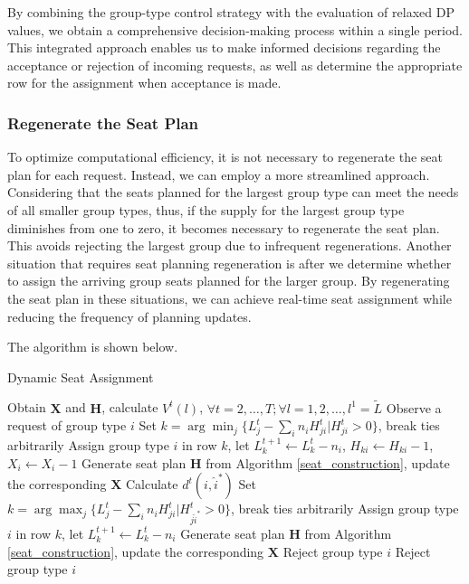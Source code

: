 
By combining the group-type control strategy with the evaluation of relaxed DP values, we obtain a comprehensive decision-making process within a single period. This integrated approach enables us to make informed decisions regarding the acceptance or rejection of incoming requests, as well as determine the appropriate row for the assignment when acceptance is made. 

\subsubsection{Regenerate the Seat Plan}
To optimize computational efficiency, it is not necessary to regenerate the seat plan for each request. Instead, we can employ a more streamlined approach. Considering that the seats planned for the largest group type can meet the needs of all smaller group types, thus, if the supply for the largest group type diminishes from one to zero, it becomes necessary to regenerate the seat plan. This avoids rejecting the largest group due to infrequent regenerations. Another situation that requires seat planning regeneration is after we determine whether to assign the arriving group seats planned for the larger group. By regenerating the seat plan in these situations, we can achieve real-time seat assignment while reducing the frequency of planning updates.

The algorithm is shown below.

\begin{algorithm}[H]
  \caption{Dynamic Seat Assignment}
  Obtain $\bm{X}$ and $\bm{H}$, calculate $V^{t}(l)$, $\forall t =2, \ldots, T; \forall l = 1,2, \ldots, l^{1}=\tilde{L}$\;
  {Observe a request of group type ${i}$\;
    {
    {Set $k = \arg \min_{j} \{L_j^{t} - \sum_{i}n_i H^{t}_{ji}|H^{t}_{ji} >0\}$, break ties arbitrarily\; 
     Assign group type $i$ in row $k$, let $L_{k}^{t+1} \gets L_{k}^{t}- n_{i}$, $H_{ki} \gets H_{ki}-1$, $X_{i}\gets X_{i}-1$\;
    {Generate seat plan $\bm{H}$ from Algorithm \ref{seat_construction}, update the corresponding $\bm{X}$\;}}
    {Calculate $d^{t}({i}, \hat{i}^{*})$\;
    {Set $k = \arg \max_{j} \{L_j^{t} - \sum_{i}n_i H_{ji}^{t}|H_{j\hat{i}^{*}}^{t} >0\}$, break ties arbitrarily\;
     Assign group type $i$ in row $k$, let $L_{k}^{t+1} \gets L_{k}^{t}- n_{i}$\;
    Generate seat plan $\bm{H}$ from Algorithm \ref{seat_construction}, update the corresponding $\bm{X}$\;}
    {Reject group type ${i}$\;}}}
    {Reject group type ${i}$\;}}
\end{algorithm}
